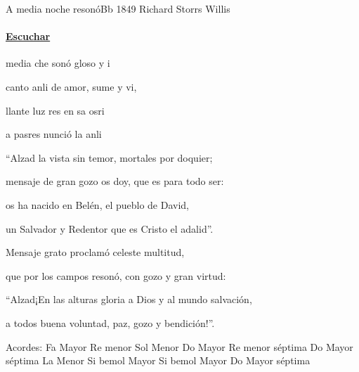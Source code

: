 \documentclass[12pt, spanish]{book}
\newcommand{\NotCCLIed}{\relax}
\begin{document}
    \begin{song}{A media noche resonó}{Bb}
    {1849} %
    {Richard Storrs Willis}
    {} %
    {} %
        \ifChordBk
            \paragraph{\mbox{}\hfill\protect\href{https://open.spotify.com/intl-es/track/2HKYkDPzrZKZsGR5hvzkvS}{Escuchar}\mbox{}\hfill}
        \fi

        \begin{SBVerse}
             media che sonó gloso y  i

             canto anli de amor, sume y vi,

            llante luz res en sa osri

             a  pasres nunció la  anli
        \end{SBVerse}

        \begin{SBVerse}
            \textquotedblleft Alzad la vista sin temor, mortales por doquier;

            mensaje de gran gozo os doy, que es para todo ser:

            os ha nacido en Belén, el pueblo de David,

            un Salvador y Redentor que es Cristo el adalid\textquotedblright.
        \end{SBVerse}

        \begin{SBVerse}
            Mensaje grato proclamó celeste multitud,

            que por los campos resonó, con gozo y gran virtud:

            \textquotedblleft Alzad¡En las alturas gloria a Dios y al mundo salvación,

            a todos buena voluntad, paz, gozo y bendición!\textquotedblright.
        \end{SBVerse}

        \ifChordBk
        \begin{SBOpGroup}
            Acordes:
            \upchord{\F}\qquad Fa Mayor \hfill
            \upchord{\Dm}\qquad Re menor  \hfill\null\break
            \upchord{\Gm}\qquad Sol Menor \hfill
            \upchord{\C}\qquad Do Mayor \hfill\null\break
            \upchord{\Dmseven}\qquad Re menor s\'eptima \hfill
            \upchord{\Cseven}\qquad Do Mayor s\'eptima \hfill\null\break
            \upchord{\Am}\qquad La Menor \hfill
            \upchord{\Bflat}\qquad Si bemol Mayor \hfill\null\break
            \upchord{\Bflat}\qquad Si bemol Mayor \hfill
            \upchord{\Cseven}\qquad Do Mayor s\'eptima \hfill\null\break
        \end{SBOpGroup}
        \fi
    \end{song}
\end{document}
